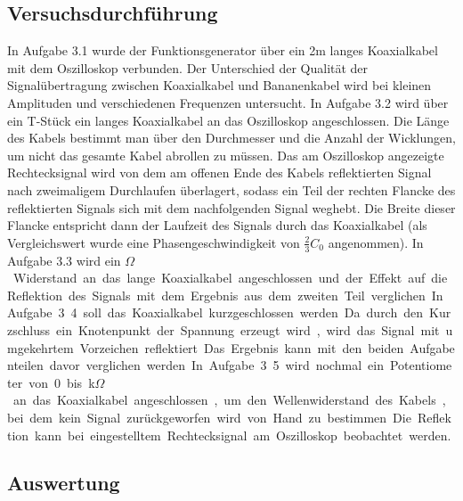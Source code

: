 \documentclass[12pt,a4paper]{article}
\begin{document}
\subsection{Versuchsdurchführung}
In Aufgabe 3.1 wurde der Funktionsgenerator über ein 2m langes Koaxialkabel mit dem Oszilloskop verbunden. Der Unterschied der Qualität der Signalübertragung zwischen Koaxialkabel und Bananenkabel wird bei kleinen Amplituden und verschiedenen Frequenzen untersucht.
In Aufgabe 3.2 wird über ein T-Stück ein langes Koaxialkabel an das Oszilloskop angeschlossen. Die Länge des Kabels bestimmt man über den Durchmesser und die Anzahl der Wicklungen, um nicht das gesamte Kabel abrollen zu müssen. Das am Oszilloskop angezeigte Rechtecksignal wird von dem am offenen Ende des Kabels reflektierten Signal nach zweimaligem Durchlaufen überlagert, sodass ein Teil der rechten Flancke des reflektierten Signals sich mit dem nachfolgenden Signal weghebt. Die Breite dieser Flancke entspricht dann der Laufzeit des Signals durch das Koaxialkabel (als Vergleichswert wurde eine Phasengeschwindigkeit von $\frac{2}{3}C_0$ angenommen).
In Aufgabe 3.3 wird ein \unit[50]{$\Omega$} Widerstand an das lange Koaxialkabel angeschlossen und der Effekt auf die Reflektion des Signals mit dem Ergebnis aus dem zweiten Teil verglichen.
In Aufgabe 3.4 soll das Koaxialkabel kurzgeschlossen werden. Da durch den Kurzschluss ein Knotenpunkt der Spannung erzeugt wird, wird das Signal mit umgekehrtem Vorzeichen reflektiert. Das Ergebnis kann mit den beiden Aufgabenteilen davor verglichen werden.
In Aufgabe 3.5 wird nochmal ein Potentiometer von 0 bis \unit[1]{k$\Omega$} an das Koaxialkabel angeschlossen, um den Wellenwiderstand des Kabels, bei dem kein Signal zurückgeworfen wird von Hand zu bestimmen. Die Reflektion kann bei eingestelltem Rechtecksignal am Oszilloskop beobachtet werden.


\subsection{Auswertung}
\end{document}
